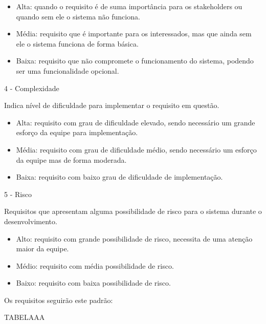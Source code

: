\begin{itemize}
\item Alta: quando o requisito é de suma importância para os stakeholders ou quando sem ele o sistema não funciona.
\item Média: requisito que é importante para os interessados, mas que ainda sem ele o sistema funciona de forma básica.
\item Baixa: requisito que não compromete o funcionamento do sistema, podendo ser uma funcionalidade opcional.
\end{itemize}

4 - Complexidade

Indica nível de dificuldade para implementar o requisito em questão.

\begin{itemize}
\item Alta: requisito com grau de dificuldade elevado, sendo necessário um grande esforço da equipe para implementação.
\item Média: requisito com grau de dificuldade médio, sendo necessário um esforço da equipe mas de forma moderada.
\item Baixa: requisito com baixo grau de dificuldade de  implementação.
\end{itemize}

5 - Risco

Requisitos que apresentam alguma possibilidade de risco para o sistema durante o desenvolvimento.

\begin{itemize}
\item Alto: requisito com grande possibilidade de risco, necessita de uma atenção maior da equipe.
\item Médio: requisito com média possibilidade de risco.
\item Baixo: requisito com baixa possibilidade de risco.
\end{itemize}

Os requisitos seguirão este padrão:

TABELAAA
